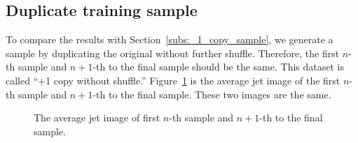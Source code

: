 \documentclass[12pt]{article}
\begin{document}
    \subsection{Duplicate training sample}%
    \label{sub:duplicate_training_sample}
        To compare the results with Section~\ref{subs:_1_copy_sample}, we generate a sample by duplicating the original without further shuffle. Therefore, the first $n$-th sample and $n+1$-th to the final sample should be the same. This dataset is called ``+1 copy without shuffle.'' Figure~\ref{fig:average_jet_image_0_to_n_n_to_2n} is the average jet image of the first $n$-th sample and $n+1$-th to the final sample. These two images are the same. 
        \begin{figure}[htpb]
            \centering
            \caption{The average jet image of first $n$-th sample and $n+1$-th to the final sample.}
            \label{fig:average_jet_image_0_to_n_n_to_2n}
        \end{figure}
\end{document}

